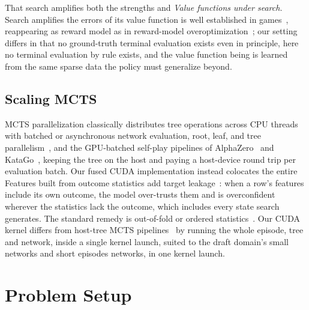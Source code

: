 \documentclass[journal]{IEEEtran}
\providecommand{\DIFaddtex}[1]{{\protect\color{blue} \sf #1}} %
\providecommand{\DIFdeltex}[1]{{\protect\color{red} \scriptsize #1}} %
\providecommand{\DIFaddbegin}{} %
\providecommand{\DIFaddend}{} %
\providecommand{\DIFdelbegin}{} %
\providecommand{\DIFdelend}{} %
\providecommand{\DIFadd}[1]{\texorpdfstring{\DIFaddtex{#1}}{#1}} %
\providecommand{\DIFdel}[1]{\texorpdfstring{\DIFdeltex{#1}}{}} %
\begin{document}
\DIFdel{That search amplifies both the strengths and }\DIFdelend \DIFaddbegin \DIFadd{\textit{Value functions under search.} Search amplifies the }\DIFaddend errors of its value function\DIFdelbegin \DIFdel{is well established in games}\DIFdelend ~\cite{silver2016mastering,silver2018general}, \DIFdelbegin \DIFdel{reappearing as reward model }\DIFdelend \DIFaddbegin \DIFadd{as in reward-model }\DIFaddend overoptimization~\cite{gao2023scaling}; \DIFdelbegin \DIFdel{our setting differs in that no ground-truth terminal evaluation exists even in principle, }\DIFdelend \DIFaddbegin \DIFadd{here no terminal evaluation by rule exists, and }\DIFaddend the value function \DIFdelbegin \DIFdel{being }\DIFdelend \DIFaddbegin \DIFadd{is }\DIFaddend learned from the \DIFdelbegin \DIFdel{same sparse }\DIFdelend data the policy must generalize beyond. \DIFdelbegin %

\subsection{\DIFdel{Scaling MCTS}}
\addtocounter{subsection}{-1}%

\DIFdel{MCTS parallelization classically distributes tree operations across CPU threads with batched or asynchronous network evaluation, root, leaf, and tree parallelism~\cite{chaslot2008parallel}, and the GPU-batched self-play pipelines of AlphaZero~\cite{silver2018general} and KataGo~\cite{wu2019accelerating}, keeping the tree on the host and paying a host-device round trip per evaluation batch. Our fused CUDA implementation instead colocates the entire }\DIFdelend \DIFaddbegin \DIFadd{Features built from outcome statistics add target leakage~\cite{kaufman2012leakage}: when a row's features include its own outcome, the model over-trusts them and is overconfident wherever the statistics lack the outcome, which includes every state search generates. The standard remedy is out-of-fold or ordered statistics~\cite{prokhorenkova2018catboost}. Our CUDA kernel differs from host-tree MCTS pipelines~\cite{chaslot2008parallel,wu2019accelerating} by running the whole }\DIFaddend episode, tree and \DIFdelbegin \DIFdel{network, inside a single kernel launch, suited to the draft domain's small networks and short episodes}\DIFdelend \DIFaddbegin \DIFadd{networks, in one kernel launch}\DIFaddend .

\section{Problem Setup}
\label{sec:setup}
\end{document}

